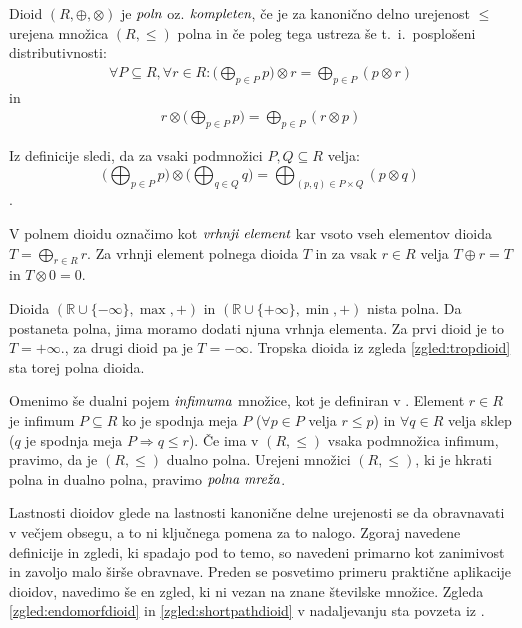 \documentclass[mat1]{fmfdelo}
\newcommand{\R}{\mathbb{R}}
\newcommand{\pojem}[1]{\ensuremath{\emph{#1}}}
\begin{document}
\begin{definicija}
	Dioid $(R, \oplus,\otimes)$ je \pojem{poln} oz. \pojem{kompleten}, če je za kanonično delno urejenost $\leq$ urejena množica $(R, \leq)$ polna in če poleg tega ustreza še t.~i.~posplošeni distributivnosti: \begin{align*}
		\forall P \subseteq R, \forall r \in R: \big(\bigoplus_{p\in P}p\big) \otimes r = \bigoplus_{p\in P} \left(p \otimes r\right)
	\end{align*}
in
\begin{align*}
	r \otimes \big( \bigoplus_{p\in P} p \big) = \bigoplus_{p \in P} \left( r \otimes p \right)
\end{align*}
\end{definicija}

Iz definicije sledi, da za vsaki podmnožici $P, Q \subseteq R$ velja: $$\big( \bigoplus_{p\in P} p \big) \otimes \big( \bigoplus_{q\in Q} q \big) = \bigoplus_{(p, q) \in P\times Q} (p \otimes q)$$.

V polnem dioidu označimo kot \pojem{vrhnji element} kar vsoto vseh elementov dioida $T = \bigoplus_{r \in R} r$. Za vrhnji element polnega dioida $T$ in za vsak $r\in R$ velja $T \oplus r = T$ in $T \otimes 0 = 0$.

\begin{zgled}
	Dioida $(\R\cup \{-\infty\}, \max, +)$ in $(\R\cup \{+\infty\}, \min, +)$ nista polna. Da postaneta polna, jima moramo dodati njuna vrhnja elementa. Za prvi dioid je to $T = +\infty$., za drugi dioid pa je $T = -\infty$. Tropska dioida iz zgleda \ref{zgled:tropdioid} sta torej polna dioida.
\end{zgled}

\begin{opomba}
	Omenimo še dualni pojem \pojem{infimuma} množice, kot je definiran v \cite[str. 10]{bib:Gondran}.
	Element $r\in R$ je infimum $P\subseteq R$ ko je spodnja meja $P$ ($\forall p \in P$ velja $ r \leq p$) in $\forall q \in R$ velja sklep ($q$ je spodnja meja $P \Rightarrow q \leq r$). Če ima v $(R, \leq)$ vsaka podmnožica infimum, pravimo, da je $(R, \leq)$ dualno polna. Urejeni množici $(R, \leq)$, ki je hkrati polna in dualno polna, pravimo \pojem{polna mreža}.
\end{opomba}

Lastnosti dioidov glede na lastnosti kanonične delne urejenosti se da obravnavati v večjem obsegu, a to ni ključnega pomena za to nalogo. Zgoraj navedene definicije in zgledi, ki spadajo pod to temo, so navedeni primarno kot zanimivost in zavoljo malo širše obravnave. Preden se posvetimo primeru praktične aplikacije dioidov, navedimo še en zgled, ki ni vezan na znane številske množice. Zgleda \ref{zgled:endomorfdioid} in \ref{zgled:shortpathdioid} v nadaljevanju sta povzeta iz \cite[poglavje 6.\,2.\,]{bib:Gondran}.
\end{document}
